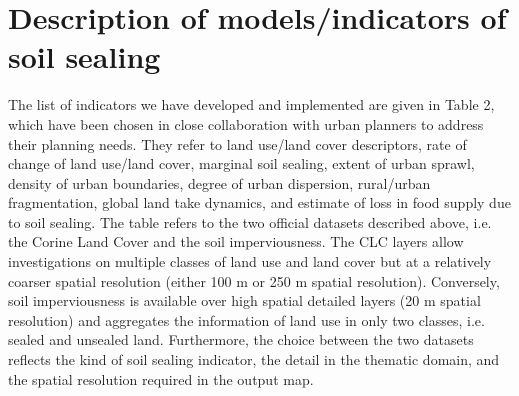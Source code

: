 \documentclass[APA,LATO1COL,doublespace]{WileyNJD-v2}
\begin{document}
\section{Description of models/indicators of soil sealing}
The list of indicators we have developed and implemented are given in Table 2, which have been chosen in close collaboration with urban planners to address their planning needs. 
They refer to land use/land cover descriptors, rate of change of land use/land cover, marginal soil sealing, extent of urban sprawl, density of urban boundaries, degree of urban dispersion, rural/urban fragmentation, global land take dynamics, and estimate of loss in food supply due to soil sealing. 
The table refers to the two official datasets described above, i.e. the Corine Land Cover and the soil imperviousness. 
The CLC layers allow investigations on multiple classes of land use and land cover but at a relatively coarser spatial resolution (either 100 m or 250 m spatial resolution).
Conversely, soil imperviousness is available over high spatial detailed layers (20 m spatial resolution) and aggregates the information of land use in only two classes, i.e. sealed and unsealed land. 
Furthermore, the choice between the two datasets reflects the kind of soil sealing indicator, the detail in the thematic domain, and the spatial resolution required in the output map. 
\end{document}
